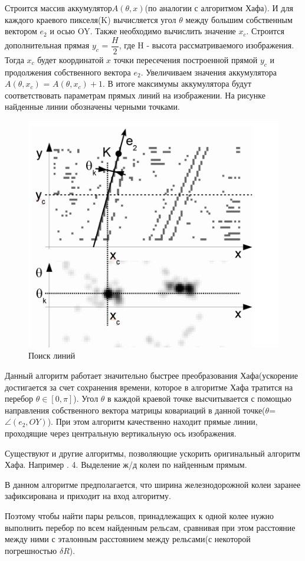 Строится массив аккумулятор$A(\theta, x)$(по аналогии с алгоритмом Хафа\cite{b:hough_transform}). И для каждого краевого пикселя(K) вычисляется угол $\theta$ между большим собственным вектором $e_2$ и осью OY. 
Также необходимо вычислить значение $x_c$. Строится дополнительная прямая $y_c$ = $\dfrac{H}{2}$, где H - высота рассматриваемого изображения. Тогда $x_c$ будет координатой $x$ точки пересечения построенной прямой $y_c$ и продолжения собственного вектора $e_2$.
Увеличиваем значения аккумулятора $A(\theta, x_c)$ = $A(\theta, x_c) + 1$.
В итоге максимумы аккумулятора будут соответствовать параметрам прямых линий на изображении. На рисунке найденные линии обозначены черными точками.
\begin{figure}[!h]
	\centering
	\includegraphics[width=0.5\linewidth]{pictures/screenshot004}
	\caption{Поиск линий}
	\label{fig:screenshot004}
\end{figure}
\newpage
Данный алгоритм работает значительно быстрее преобразования Хафа(ускорение достигается за счет сохранения времени, которое в алгоритме Хафа тратится на перебор $\theta \in [0, \pi]$). Угол $\theta$ в каждой краевой точке высчитывается с помощью направления собственного вектора матрицы ковариаций в данной точке($\theta$= $\angle(e_2, OY)$). 
При этом алгоритм качественно находит прямые линии, проходящие через центральную вертикальную ось изображения.

Существуют и другие алгоритмы, позволяющие ускорить оригинальный алгоритм Хафа. Например \cite{b:hough_fast}.
4. Выделение ж/д колеи по найденным прямым.

В данном алгоритме предполагается, что ширина железнодорожной колеи заранее зафиксирована и приходит на вход алгоритму. 

Поэтому чтобы найти пары рельсов, принадлежащих к одной колее нужно выполнить перебор по всем найденным рельсам, сравнивая при этом расстояние между ними с эталонным расстоянием между рельсами(с некоторой погрешностью $\delta R$).

